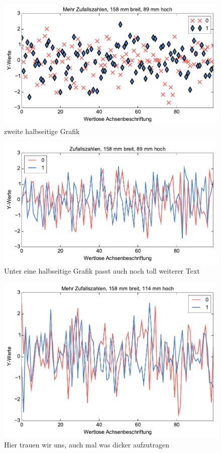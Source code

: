 \begin{figure}
\includegraphics[scale=1]{Pictures/halbeSeite2}
\caption{zweite halbseitige Grafik}
\label{fig:sinnvolles_label2}
\end{figure}
\Blindtext

\begin{figure}
\includegraphics[scale=1]{Pictures/halbeSeite1}
\caption{Unter eine halbseitige Grafik passt auch noch toll weiterer Text}
\label{fig:sinnvolles_label3}
\end{figure}
\Blindtext

\begin{figure}
\includegraphics[scale=1]{Pictures/zweiDrittel}
\caption{Hier trauen wir uns, auch mal was dicker aufzutragen}
\label{fig:sinnvolles_label3}
\end{figure}

